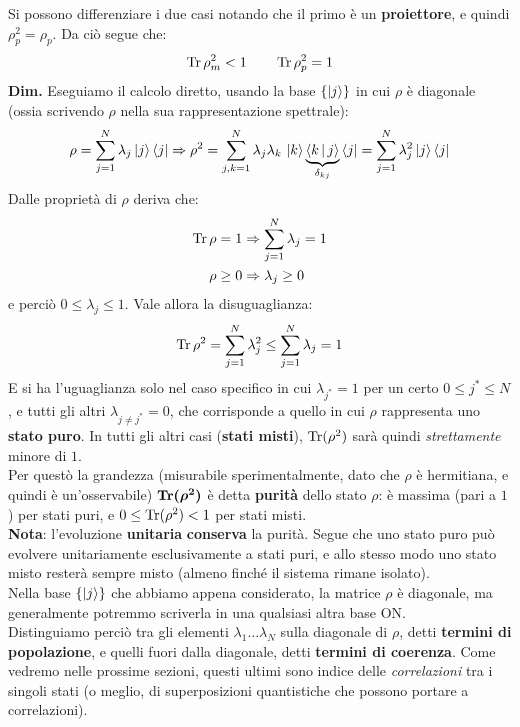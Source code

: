 \documentclass[../../InformazioneQuantistica.tex]{subfiles}
\begin{document}
Si possono differenziare i due casi notando che il primo è un \textbf{proiettore}, e quindi $\rho_p^2 = \rho_p$. Da ciò segue che:
\begin{align*}
\operatorname{Tr} \rho_m^2 < 1 \qquad \operatorname{Tr} \rho_p^2 = 1
\end{align*}
\textbf{Dim.} Eseguiamo il calcolo diretto, usando la base $\{\Ket{j}\}$ in cui $\rho$ è diagonale (ossia scrivendo $\rho$ nella sua rappresentazione spettrale):
\begin{align*}
\rho = \sum_{j=1}^{N} \lambda_j \Ket{j}\Bra{j} \Rightarrow \rho^2 = \sum_{j,k=1}^N \lambda_j \lambda_k \, \Ket{k}\underbrace{\Braket{k|j}}_{\delta_{kj}}\Bra{j}= \sum_{j=1}^{N} \lambda_j^2 \Ket{j}\Bra{j}
\end{align*}
Dalle proprietà di $\rho$ deriva che:
\begin{align*}
    \operatorname{Tr} \rho = 1 &\Rightarrow \sum_{j=1}^N \lambda_j = 1\\
    \rho \geq 0 & \Rightarrow \lambda_j \geq 0
\end{align*}
e perciò $0\leq \lambda_j \leq 1$. Vale allora la disuguaglianza:
\begin{align*}
\operatorname{Tr} \rho^2 = \sum_{j=1}^N \lambda_j^2  \leq \sum_{j=1}^N \lambda_j = 1
\end{align*}
E si ha l'uguaglianza solo nel caso specifico in cui $\lambda_{j^*}=1$ per un certo $0 \leq j^* \leq N$, e tutti gli altri $\lambda_{j \neq j^*}=0$, che corrisponde a quello in cui $\rho$ rappresenta uno \textbf{stato puro}. In tutti gli altri casi (\textbf{stati misti}), $\operatorname{Tr}(\rho^2)$ sarà quindi \textit{strettamente} minore di $1$.\\
Per questò la grandezza (misurabile sperimentalmente, dato che $\rho$ è hermitiana, e quindi è un'osservabile) $\operatorname{\textbf{Tr}}\bm{(\rho^2)}$ è detta \textbf{purità} dello stato $\rho$: è massima (pari a $1$) per stati puri, e $0\leq \operatorname{Tr}(\rho^2) < 1$ per stati misti.\\

\textbf{Nota}: l'evoluzione \textbf{unitaria} \textbf{conserva} la purità. Segue che uno stato puro può evolvere unitariamente esclusivamente a stati puri, e allo stesso modo uno stato misto resterà sempre misto (almeno finché il sistema rimane isolato).\\

Nella base $\{\Ket{j}\}$ che abbiamo appena considerato, la matrice $\rho$ è diagonale, ma generalmente potremmo scriverla in una qualsiasi altra base ON.\\
Distinguiamo perciò tra gli elementi $\lambda_1 \dots \lambda_N$ sulla diagonale di $\rho$, detti \textbf{termini di popolazione}, e quelli fuori dalla diagonale, detti \textbf{termini di coerenza}. Come vedremo nelle prossime sezioni, questi ultimi sono indice delle \textit{correlazioni} tra i singoli stati (o meglio, di superposizioni quantistiche che possono portare a correlazioni).\\
\end{document}
